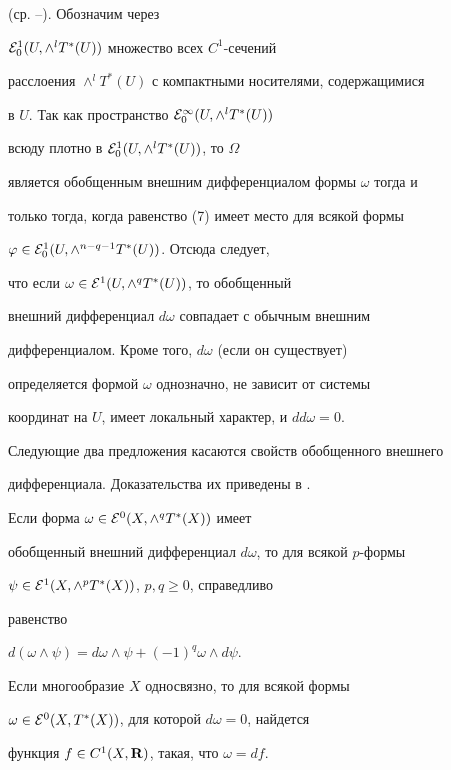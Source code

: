 (ср. \cite{Bor1}--\cite{Bor3}). Обозначим через


${\cal E}^1_0(U,\wedge^lT^*(U))$ множество всех $C^1$-сечений


расслоения $\wedge^lT^*(U)$ с компактными носителями, содержащимися


в $U$. Так как пространство ${\cal E}^{\infty}_0(U,\wedge^lT^*(U))$


всюду плотно в ${\cal E}^1_0(U,\wedge^lT^*(U))$, то $\Omega$


является обобщенным внешним дифференциалом формы $\omega$ тогда и


только тогда, когда равенство (7) имеет место для всякой формы


$\varphi\in {\cal E}^1_0(U,\wedge^{n-q-1}T^*(U))$. Отсюда следует,


что если $\omega\in {\cal E}^1(U,\wedge^qT^*(U))$, то обобщенный


внешний дифференциал $d\omega$ совпадает с обычным внешним


дифференциалом. Кроме того, $d\omega$ (если он существует)


определяется формой $\omega$ однозначно, не зависит от системы


координат на $U$, имеет локальный характер, и $dd\omega= 0$.





Следующие два предложения касаются свойств обобщенного внешнего


дифференциала. Доказательства их приведены в \cite{Mark4}.





\begin{lem}


Если форма $\omega\in {\cal E}^0(X,\wedge^qT^*(X))$ имеет


обобщенный внешний дифференциал $d\omega$, то для всякой $p$-формы


$\psi\in {\cal E}^1(X,\wedge^pT^*(X))$, $p,q\ge0$, справедливо


равенство


$d(\omega\wedge \psi)= d\omega\wedge \psi+ (-1)^q\omega\wedge d\psi$.


\end{lem}





\begin{lem}


Если многообразие $X$ односвязно, то для всякой формы


$\omega\in {\cal E}^0(X,T^*(X))$, для которой $d\omega= 0$, найдется


функция $f\in C^1(X,{\bold R})$, такая, что $\omega= df$.


\end{lem}






